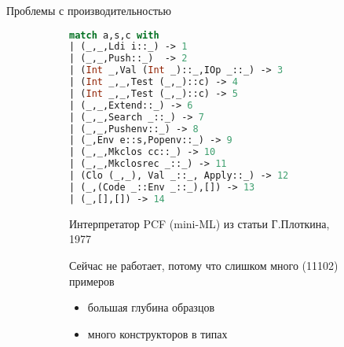 \documentclass[aspectratio=169
  , xcolor={svgnames}
  , hyperref={ colorlinks,citecolor=Blue
             , linkcolor=DarkRed,urlcolor=DarkBlue}
  , russian
  ]{beamer}
\begin{document}
\begin{frame}[fragile]{Проблемы с производительностью}
\begin{figure}
\begin{subfigure}[t]{0.5\linewidth}
\begin{lstlisting}[basicstyle=\small,language=ocaml]
match a,s,c with
| (_,_,Ldi i::_) -> 1
| (_,_,Push::_)  -> 2
| (Int _,Val (Int _)::_,IOp _::_) -> 3
| (Int _,_,Test (_,_)::c) -> 4
| (Int _,_,Test (_,_)::c) -> 5
| (_,_,Extend::_) -> 6
| (_,_,Search _::_) -> 7
| (_,_,Pushenv::_) -> 8
| (_,Env e::s,Popenv::_) -> 9
| (_,_,Mkclos cc::_) -> 10
| (_,_,Mkclosrec _::_) -> 11
| (Clo (_,_), Val _::_, Apply::_) -> 12
| (_,(Code _::Env _::_),[]) -> 13
| (_,[],[]) -> 14
\end{lstlisting}
\end{subfigure}
\hspace{1cm}
\begin{subfigure}[t]{0.35\linewidth}\vspace{0em}
Интерпретатор PCF (mini-ML) из статьи Г.Плоткина, 1977
\vspace{4em}

Сейчас не работает, потому что слишком много (11102) примеров
\begin{itemize}
\item большая глубина образцов
\item много конструкторов в типах
\end{itemize}

\end{subfigure}
\end{figure}
\end{frame}
\end{document}
